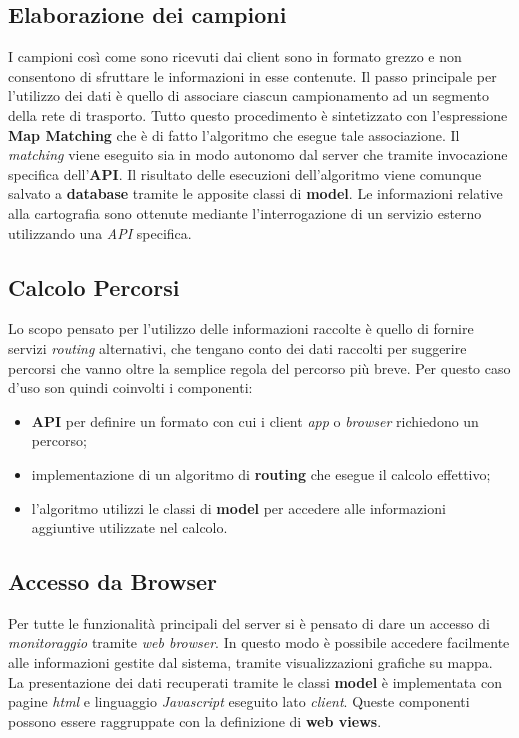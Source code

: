 \subsection{Elaborazione dei campioni}
I campioni così come sono ricevuti dai client sono in formato grezzo e non consentono di sfruttare le informazioni in esse contenute. Il passo principale per l'utilizzo dei dati è quello di associare ciascun campionamento ad un segmento della rete di trasporto. Tutto questo procedimento è sintetizzato con l'espressione \textbf{Map Matching} che è di fatto l'algoritmo che esegue tale associazione. Il \emph{matching} viene eseguito sia in modo autonomo dal server che tramite invocazione specifica dell'\textbf{API}. Il risultato delle esecuzioni dell'algoritmo viene comunque salvato a \textbf{database} tramite le apposite classi di \textbf{model}. Le informazioni relative alla cartografia sono ottenute mediante l'interrogazione di un servizio esterno utilizzando una \emph{API} specifica.

\subsection{Calcolo Percorsi}
Lo scopo pensato per l'utilizzo delle informazioni raccolte è quello di fornire servizi \emph{routing} alternativi, che tengano conto dei dati raccolti per suggerire percorsi che vanno oltre la semplice regola del percorso più breve. Per questo caso d'uso son quindi coinvolti i componenti:
\begin{itemize}
\item \textbf{API} per definire un formato con cui i client \emph{app} o \emph{browser} richiedono un percorso;
\item implementazione di un algoritmo di \textbf{routing} che esegue il calcolo effettivo;
\item l'algoritmo utilizzi le classi di \textbf{model} per accedere alle informazioni aggiuntive utilizzate nel calcolo.
\end{itemize}

\subsection{Accesso da Browser}
Per tutte le funzionalità principali del server si è pensato di dare un accesso di \emph{monitoraggio} tramite \emph{web browser}. In questo modo è possibile accedere facilmente alle informazioni gestite dal sistema, tramite visualizzazioni grafiche su mappa. La presentazione dei dati recuperati tramite le classi \textbf{model} è implementata con pagine \emph{html} e linguaggio \emph{Javascript} eseguito lato \emph{client}. Queste componenti possono essere raggruppate con la definizione di \textbf{web views}.

